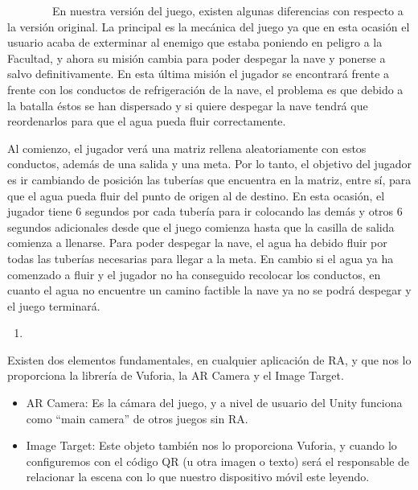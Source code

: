 ~~~~~~~~En nuestra versión del juego, existen algunas diferencias con
respecto a la versión original. La principal es la mecánica del juego ya
que en esta ocasión el usuario acaba de exterminar al enemigo que estaba
poniendo en peligro a la Facultad, y ahora su misión cambia para poder
despegar la nave y ponerse a salvo definitivamente. En esta última
misión el jugador se encontrará frente a frente con los conductos de
refrigeración de la nave, el problema es que debido a la batalla éstos
se han dispersado y si quiere despegar la nave tendrá que reordenarlos
para que el agua pueda fluir correctamente.

Al comienzo, el jugador verá una matriz rellena aleatoriamente con estos
conductos, además de una salida y una meta. Por lo tanto, el objetivo
del jugador es ir cambiando de posición las tuberías que encuentra en la
matriz, entre sí, para que el agua pueda fluir del punto de origen al de
destino. En esta ocasión, el jugador tiene 6 segundos por cada tubería
para ir colocando las demás y otros 6 segundos adicionales desde que el
juego comienza hasta que la casilla de salida comienza a llenarse. Para
poder despegar la nave, el agua ha debido fluir por todas las tuberías
necesarias para llegar a la meta. En cambio si el agua ya ha comenzado a
fluir y el jugador no ha conseguido recolocar los conductos, en cuanto
el agua no encuentre un camino factible la nave ya no se podrá despegar
y el juego terminará.

\begin{enumerate}
\def\labelenumi{\arabic{enumi}.}
\setcounter{enumi}{2}
\item
\end{enumerate}


Existen dos elementos fundamentales, en cualquier aplicación de RA, y
que nos lo proporciona la librería de Vuforia, la AR Camera y el Image
Target.

\begin{itemize}
\itemsep1pt\parskip0pt
\item
  AR Camera: Es la cámara del juego, y a nivel de usuario del Unity
  funciona como ``main camera'' de otros juegos sin RA.
\item
  Image Target: Este objeto también nos lo proporciona Vuforia, y cuando
  lo configuremos con el código QR (u otra imagen o texto) será el
  responsable de relacionar la escena con lo que nuestro dispositivo
  móvil este leyendo.
\end{itemize}

